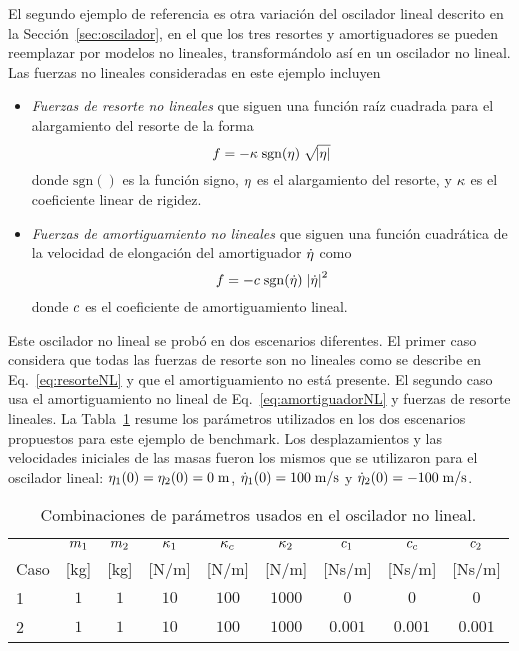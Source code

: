El segundo ejemplo de referencia es otra variación del oscilador lineal descrito en la Sección~\ref{sec:oscilador}, en el que los tres resortes y amortiguadores se pueden reemplazar por modelos no lineales, transformándolo así en un oscilador no lineal.
Las fuerzas no lineales consideradas en este ejemplo incluyen
%
\begin{itemize}
	\item \emph{Fuerzas de resorte no lineales} que siguen una función raíz cuadrada para el alargamiento del resorte de la forma
	\begin{equation}
		f = - \kappa \; {\mathrm{sgn}}(\eta) \; \sqrt{\abs{\eta}} 
		\label{eq:resorteNL}
	\end{equation}
	donde ${\mathrm{sgn}}()$ es la función signo, $\eta$ es el alargamiento del resorte, y $\kappa$ es el coeficiente linear de rigidez.
	\\
	\item \emph{Fuerzas de amortiguamiento no lineales} que siguen una función cuadrática de la velocidad de elongación del amortiguador $\dot{\eta}$ como
	\begin{equation}
		f = - c \; {\mathrm{sgn}}(\dot{\eta}) \; \abs{\dot{\eta}}^2
		\label{eq:amortiguadorNL}
	\end{equation}
	donde $c$ es el coeficiente de amortiguamiento lineal.
\end{itemize}
%
Este oscilador no lineal se probó en dos escenarios diferentes.
El primer caso considera que todas las fuerzas de resorte son no lineales como se describe en Eq.~\eqref{eq:resorteNL} y que el amortiguamiento no está presente.
El segundo caso usa el amortiguamiento no lineal de Eq.~\eqref{eq:amortiguadorNL} y fuerzas de resorte lineales.
La Tabla~\ref{tab:DNLOpp} resume los parámetros utilizados en los dos escenarios propuestos para este ejemplo de benchmark.
Los desplazamientos y las velocidades iniciales de las masas fueron los mismos que se utilizaron para el oscilador lineal: $\eta_1(0) = \eta_2(0) = 0{\; \mathrm {m}}$, $\dot{\eta}_1(0) = 100{\; \mathrm {m/s}} $ y $\dot{\eta}_2(0) = -100{\; \mathrm {m/s}}$.

\begin{table}[ht]
	\caption{Combinaciones de parámetros usados en el oscilador no lineal.}
	\begin{center}
		\label{tab:DNLOpp}
		{ \footnotesize{
				\renewcommand{\arraystretch}{1.25}
				\begin{tabular}{lcccccccc}
					\hline
					& $m_1$ 	& $m_2$ 	&$\kappa_1$ & $\kappa_c$  &$\kappa_2$ &$c_1$ & $c_c$ & $c_2$ \\
					Caso	& [kg]	& [kg]	& [N/m] & [N/m] & [N/m] & [Ns/m] & [Ns/m] & [Ns/m] \\
					\hline
					1		& $1$ 		& $1$ 	& $10$ & $100$ & $1000$ & $0$ & $0$ & $0$ \\
					2		& $1$ 		& $1$ 	& $10$ & $100$ & $1000$ & $0.001$ & $0.001$ & $0.001$ \\
				\end{tabular}
		}}
	\end{center}
\end{table}

